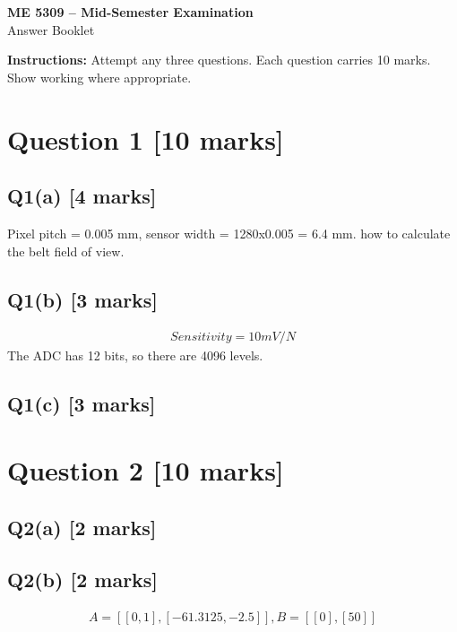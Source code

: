 \documentclass[11pt,a4paper]{article}
\begin{document}
\begin{center}
{\Large\bfseries ME 5309 -- Mid-Semester Examination}\\[3pt]
{\large Answer Booklet}\\[8pt]
\end{center}
\textbf{Instructions:} Attempt any three questions. Each question carries 10 marks. Show working where appropriate.
\section*{Question 1 \hfill [10 marks]}
\subsection*{Q1(a) \hfill [4 marks]}

Pixel pitch = 0.005 mm, sensor width = 1280x0.005 = 6.4 mm. how to calculate the belt field of view.

\subsection*{Q1(b) \hfill [3 marks]}

\[\begin{aligned}Sensitivity = 10 mV/N\end{aligned}\]
The ADC has 12 bits, so there are 4096 levels.

\subsection*{Q1(c) \hfill [3 marks]}

\vspace{2mm}

\section*{Question 2 \hfill [10 marks]}
\subsection*{Q2(a) \hfill [2 marks]}

\vspace{2mm}

\subsection*{Q2(b) \hfill [2 marks]}

\[\begin{aligned}A = [[0,1], [-61.3125,-2.5]], B = [[0],[50]]\end{aligned}\]
\end{document}
